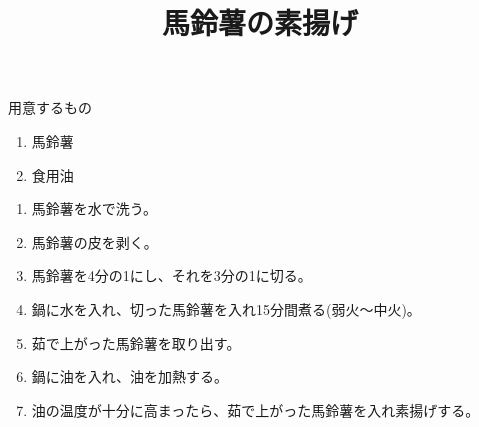 \documentclass{ujarticle}
\title{馬鈴薯の素揚げ}
\date{\todaye}
\begin{document}
\renewcommand\thefootnote{\arabic{footnote})}
\def\vector#1{\mbox{\boldmath $#1$}}

\maketitle

\begin{itembox}[l]{用意するもの}
    \begin{enumerate}
        \item 馬鈴薯
        \item 食用油
    \end{enumerate}
\end{itembox}

\begin{enumerate}
    \item 馬鈴薯を水で洗う。
    \item 馬鈴薯の皮を剥く。
    \item 馬鈴薯を4分の1にし、それを3分の1に切る。
    \item 鍋に水を入れ、切った馬鈴薯を入れ15分間煮る(弱火〜中火)。
    \item 茹で上がった馬鈴薯を取り出す。
    \item 鍋に油を入れ、油を加熱する。
    \item 油の温度が十分に高まったら、茹で上がった馬鈴薯を入れ素揚げする。
\end{enumerate}
\end{document}
